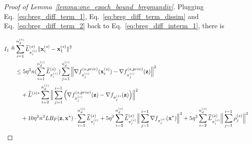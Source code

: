\begin{proof}[Proof of Lemma~\ref{lemma:one_epoch_bound_bregmandiv}]
    Plugging Eq.~\ref{eq:breg_diff_term_1}, Eq.~\ref{eq:breg_diff_term_dissim} and Eq.~\ref{eq:breg_diff_term_2} back to Eq.~\ref{eq:breg_diff_interm_1}, there is
    
    \begin{align}
    \label{eq:breg_div_interm_ub}
        I_1 \triangleq & \sum_{i=1}^{n_d^{(s)}} \widehat{L}_{\pi_i^{(s)}}^{(s)} \|{\mathbf{x}}_i^{(s)} - {\mathbf{x}}_1^{(s)}\|^2 \\
        \nonumber
        &\leq 5 \eta^2 n (\sum_{i=1}^{n_d^{(s)}} \widehat{L}_{\pi_i^{(s)}}^{(s)}) \sum_{j=1}^{n_d^{(s)}}
        \Big\| \nabla f_{\pi_j^{(s)}}^{(s, priv)}({\mathbf{x}}_i^{(s)}) - \nabla f_{\pi_j^{(s)}}^{(s, priv)}({\mathbf{z}})\Big\|^2
        \\
        \nonumber
        &\quad + \widehat{L}^{(s)*} \sum_{i=2}^{n_d^{(s)}}
        \Big\| \sum_{j=1}^{i-1} \Big( \nabla f_{\pi_j^{(s)}}^{(s, priv)}({\mathbf{z}}) - \nabla f_{\pi_j^{(s)}}({\mathbf{z}})\Big) \Big\|^2\\
        \nonumber
        &\quad + 10 \eta^2 n^2 L B_F({\mathbf{z}}, {\mathbf{x}}^*) \cdot \sum_{i=1}^{n_d^{(s)}} \widehat{L}_{\pi_i^{(s)}}^{(s)}
        + 5 \eta^2 \sum_{i=2}^{n_d^{(s)}} \widehat{L}_{\pi_i^{(s)}}^{(s)}
        \Big\| \sum_{j=1}^{i-1} \nabla f_{\pi_j^{(s)}} ({\mathbf{x}}^*) \Big\|^2
        + 5 \eta^2 \sum_{i=2}^{n_d^{(s)}} \widehat{L}_{\pi_i^{(s)}}^{(s)}
        \Big\| \sum_{j=1}^{i-1}\rho_j^{(s)}\Big\|^2
    \end{align}


\end{proof}
